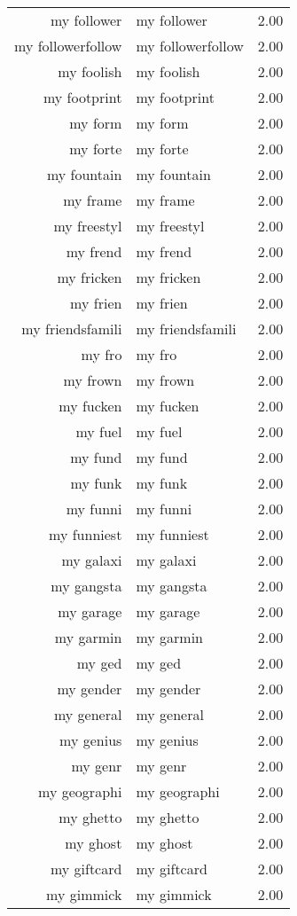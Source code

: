 \begin{table}[ht]
\begin{tabular}{rlr}
  my follower & my follower & 2.00 \\ 
  my followerfollow & my followerfollow & 2.00 \\ 
  my foolish & my foolish & 2.00 \\ 
  my footprint & my footprint & 2.00 \\ 
  my form & my form & 2.00 \\ 
  my forte & my forte & 2.00 \\ 
  my fountain & my fountain & 2.00 \\ 
  my frame & my frame & 2.00 \\ 
  my freestyl & my freestyl & 2.00 \\ 
  my frend & my frend & 2.00 \\ 
  my fricken & my fricken & 2.00 \\ 
  my frien & my frien & 2.00 \\ 
  my friendsfamili & my friendsfamili & 2.00 \\ 
  my fro & my fro & 2.00 \\ 
  my frown & my frown & 2.00 \\ 
  my fucken & my fucken & 2.00 \\ 
  my fuel & my fuel & 2.00 \\ 
  my fund & my fund & 2.00 \\ 
  my funk & my funk & 2.00 \\ 
  my funni & my funni & 2.00 \\ 
  my funniest & my funniest & 2.00 \\ 
  my galaxi & my galaxi & 2.00 \\ 
  my gangsta & my gangsta & 2.00 \\ 
  my garage & my garage & 2.00 \\ 
  my garmin & my garmin & 2.00 \\ 
  my ged & my ged & 2.00 \\ 
  my gender & my gender & 2.00 \\ 
  my general & my general & 2.00 \\ 
  my genius & my genius & 2.00 \\ 
  my genr & my genr & 2.00 \\ 
  my geographi & my geographi & 2.00 \\ 
  my ghetto & my ghetto & 2.00 \\ 
  my ghost & my ghost & 2.00 \\ 
  my giftcard & my giftcard & 2.00 \\ 
  my gimmick & my gimmick & 2.00 \\ 

\end{tabular}
\end{table}
